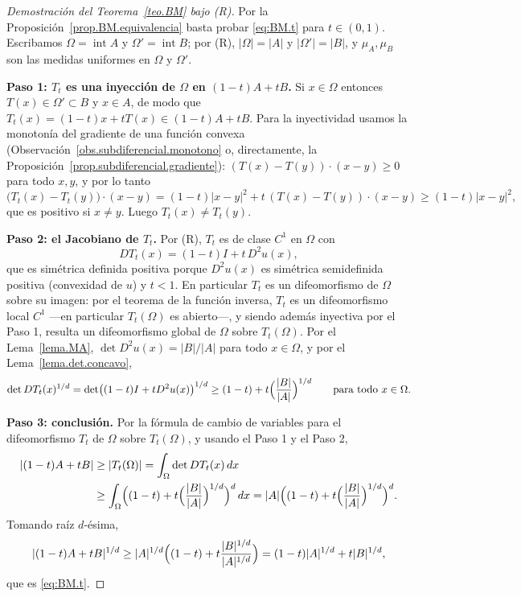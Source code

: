 \documentclass[12pt, a4paper]{amsbook}
\theoremstyle{remark}
\theoremstyle{definition}
\numberwithin{section}{chapter}
\numberwithin{subsection}{section}
\numberwithin{equation}{section}
\numberwithin{figure}{chapter}
\begin{document}
\begin{proof}[Demostración del Teorema~\ref{teo.BM} bajo (R)]
Por la Proposición~\ref{prop.BM.equivalencia} basta probar \eqref{eq:BM.t}
para $t\in(0,1)$. Escribamos $\Omega=\operatorname{int}A$ y
$\Omega'=\operatorname{int}B$; por (R), $|\Omega|=|A|$ y $|\Omega'|=|B|$, y
$\mu_A,\mu_B$ son las medidas uniformes en $\Omega$ y $\Omega'$.

\medskip
\textbf{Paso 1: $T_t$ es una inyección de $\Omega$ en $(1-t)A+tB$.}
Si $x\in\Omega$ entonces $T(x)\in\Omega'\subset B$ y $x\in A$, de modo que
$T_t(x)=(1-t)x+tT(x)\in(1-t)A+tB$. Para la inyectividad usamos la monotonía
del gradiente de una función convexa (Observación~\ref{obs.subdiferencial.monotono}
o, directamente, la Proposición~\ref{prop.subdiferencial.gradiente}):
$(T(x)-T(y))\cdot(x-y)\ge0$ para todo $x,y$, y por lo tanto
\[
\bigl(T_t(x)-T_t(y)\bigr)\cdot(x-y)
=(1-t)|x-y|^2+t\,(T(x)-T(y))\cdot(x-y)\ge(1-t)|x-y|^2,
\]
que es positivo si $x\neq y$. Luego $T_t(x)\neq T_t(y)$.

\medskip
\textbf{Paso 2: el Jacobiano de $T_t$.}
Por (R), $T_t$ es de clase $C^1$ en $\Omega$ con
\[
DT_t(x)=(1-t)I+t\,D^2u(x),
\]
que es simétrica definida positiva porque $D^2u(x)$ es simétrica
semidefinida positiva (convexidad de $u$) y $t<1$. En particular $T_t$ es un
difeomorfismo de $\Omega$ sobre su imagen: por el teorema de la función
inversa, $T_t$ es un difeomorfismo local $C^1$ —en particular $T_t(\Omega)$
es abierto—, y siendo además inyectiva por el Paso 1, resulta un
difeomorfismo global de $\Omega$ sobre $T_t(\Omega)$. Por el Lema~\ref{lema.MA},
$\det D^2u(x)=|B|/|A|$ para todo $x\in\Omega$, y por el
Lema~\ref{lema.det.concavo},
\[
\det DT_t(x)^{1/d}
=\det\bigl((1-t)I+tD^2u(x)\bigr)^{1/d}
\ge(1-t)+t\Bigl(\frac{|B|}{|A|}\Bigr)^{1/d}
\qquad\text{para todo }x\in\Omega.
\]

\medskip
\textbf{Paso 3: conclusión.}
Por la fórmula de cambio de variables para el difeomorfismo $T_t$ de
$\Omega$ sobre $T_t(\Omega)$, y usando el Paso 1 y el Paso 2,
\[
\begin{aligned}
|(1-t)A+tB|
&\ge|T_t(\Omega)|
=\int_\Omega\det DT_t(x)\,dx\\
&\ge\int_\Omega\Bigl((1-t)+t\Bigl(\frac{|B|}{|A|}\Bigr)^{1/d}\Bigr)^d\,dx
=|A|\Bigl((1-t)+t\Bigl(\frac{|B|}{|A|}\Bigr)^{1/d}\Bigr)^d.
\end{aligned}
\]
Tomando raíz $d$-ésima,
\[
|(1-t)A+tB|^{1/d}\ge|A|^{1/d}\Bigl((1-t)+t\frac{|B|^{1/d}}{|A|^{1/d}}\Bigr)
=(1-t)|A|^{1/d}+t|B|^{1/d},
\]
que es \eqref{eq:BM.t}.
\end{proof}
\end{document}
